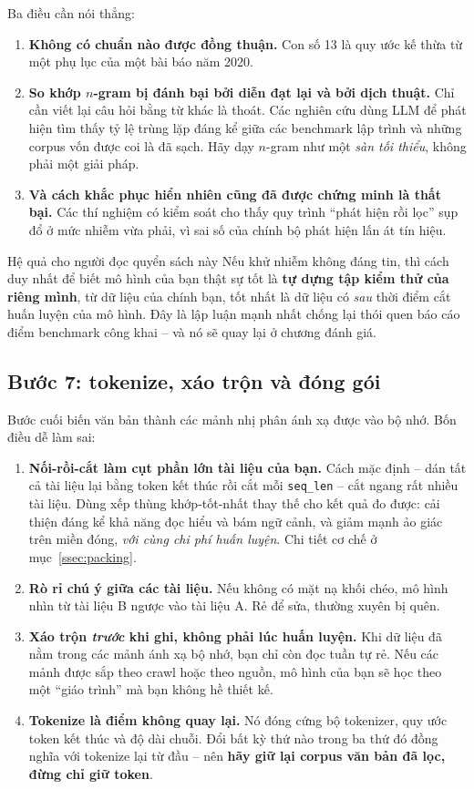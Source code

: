 Ba điều cần nói thẳng:
\begin{enumerate}
	\item \textbf{Không có chuẩn nào được đồng thuận.} Con số 13 là quy ước kế thừa từ một phụ lục của một bài báo năm 2020.
	\item \textbf{So khớp $n$-gram bị đánh bại bởi diễn đạt lại và bởi dịch thuật.} Chỉ cần viết lại câu hỏi bằng từ khác là thoát. Các nghiên cứu dùng LLM để phát hiện tìm thấy tỷ lệ trùng lặp đáng kể giữa các benchmark lập trình và những corpus vốn được coi là đã sạch. Hãy dạy $n$-gram như một \emph{sàn tối thiểu}, không phải một giải pháp.
	\item \textbf{Và cách khắc phục hiển nhiên cũng đã được chứng minh là thất bại.} Các thí nghiệm có kiểm soát cho thấy quy trình “phát hiện rồi lọc” sụp đổ ở mức nhiễm vừa phải, vì sai số của chính bộ phát hiện lấn át tín hiệu.
\end{enumerate}

\begin{keyidea}{Hệ quả cho người đọc quyển sách này}
Nếu khử nhiễm không đáng tin, thì cách duy nhất để biết mô hình của bạn thật sự tốt là \textbf{tự dựng tập kiểm thử của riêng mình}, từ dữ liệu của chính bạn, tốt nhất là dữ liệu có \emph{sau} thời điểm cắt huấn luyện của mô hình. Đây là lập luận mạnh nhất chống lại thói quen báo cáo điểm benchmark công khai -- và nó sẽ quay lại ở chương đánh giá.
\end{keyidea}

\subsection{Bước 7: tokenize, xáo trộn và đóng gói}
\label{ssec:tokenize_pack}

Bước cuối biến văn bản thành các mảnh nhị phân ánh xạ được vào bộ nhớ. Bốn điều dễ làm sai:

\begin{enumerate}
	\item \textbf{Nối-rồi-cắt làm cụt phần lớn tài liệu của bạn.} Cách mặc định -- dán tất cả tài liệu lại bằng token kết thúc rồi cắt mỗi \texttt{seq\_len} -- cắt ngang rất nhiều tài liệu. Dùng xếp thùng khớp-tốt-nhất thay thế cho kết quả đo được: cải thiện đáng kể khả năng đọc hiểu và bám ngữ cảnh, và giảm mạnh ảo giác trên miền đóng, \emph{với cùng chi phí huấn luyện}. Chi tiết cơ chế ở mục~\ref{ssec:packing}.
	\item \textbf{Rò rỉ chú ý giữa các tài liệu.} Nếu không có mặt nạ khối chéo, mô hình nhìn từ tài liệu B ngược vào tài liệu A. Rẻ để sửa, thường xuyên bị quên.
	\item \textbf{Xáo trộn \emph{trước} khi ghi, không phải lúc huấn luyện.} Khi dữ liệu đã nằm trong các mảnh ánh xạ bộ nhớ, bạn chỉ còn đọc tuần tự rẻ. Nếu các mảnh được sắp theo crawl hoặc theo nguồn, mô hình của bạn sẽ học theo một “giáo trình” mà bạn không hề thiết kế.
	\item \textbf{Tokenize là điểm không quay lại.} Nó đóng cứng bộ tokenizer, quy ước token kết thúc và độ dài chuỗi. Đổi bất kỳ thứ nào trong ba thứ đó đồng nghĩa với tokenize lại từ đầu -- nên \textbf{hãy giữ lại corpus văn bản đã lọc, đừng chỉ giữ token}.
\end{enumerate}

